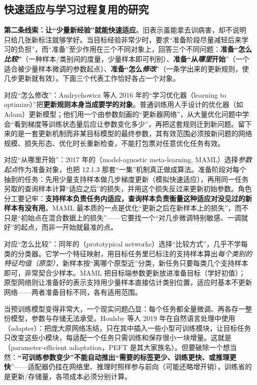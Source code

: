 \subsection{快速适应与学习过程复用的研究}
\label{sec:kts-overview-history-adaptation}

\textbf{第二条线索：让“少量新经验”就能快速适应}。旧表示虽能拿去训病害，却不说明只给几张新标注就够学好。当目标经验非常少时，要求“准备阶段尽量减轻后来学习的负担”，而“准备”至少作用在三个不同对象上，回答三个不同问题：\textbf{准备“怎么\emph{比较}”}（一种样本/类别间的度量，少量样本即可判别）、\textbf{准备“从\emph{哪里}开始}”（一个适合被少量样本微调的参数起点）、\textbf{准备“怎么\emph{修改}}”（一条学出来的更新规则，使几步更新就有效）。下面三个代表工作恰好各占一个对象。

对应“怎么修改”：Andrychowicz 等人 2016 年的“学习优化器（learning to optimize）”把\textbf{更新规则本身当成要学的对象}。普通训练用人手设计的优化器（如 Adam）更新模型；他们用一个由参数刻画的“更新器网络”，从大量优化问题中学会“看到梯度等训练状态量后应让参数变化多少”，再把这套规则迁到新问题。留下来的是一套更新机制而非某目标模型的最终参数，其有效范围必须按新问题的网络规模、损失形态、优化时长重新检查，不能打包票对任意优化任务有效。

对应“从哪里开始”：2017 年的（model-agnostic meta-learning, MAML）选择\emph{参数起点}作为准备对象，也把 12.1.3 那套“一集”机制真正做成算法。准备阶段对每个抽到的任务：先用少量支持样本做几步梯度更新（模拟快速适应），再用同一任务另取的查询样本计算“适应之后”的损失，并用这个损失反过来更新初始参数。角色分工要记牢：\textbf{支持样本负责任务内适应，查询样本负责衡量这种适应对没见过的新样本有没有用}。MAML 最本质的一点是优化“更新之后在新样本上的损失”，而不只是“初始点在混合数据上的损失”——它要找一个“对几步微调特别敏感、一调就好”的起点，而非一开始就最准的点。

对应“怎么比较”：同年的（prototypical networks）选择“比较方式”，几乎不学每类的分类器。它学一个特征映射，用目标任务里已标注的支持样本算出\emph{每个类别的特征均值（原型）}，新样本按“离哪个原型近”分类，新任务只要每类几个支持样本即可，非常契合少样本。MAML 把目标端参数更新放进准备目标（学好初值）；原型网络则让准备好的表示支持用少量样本直接估计类别位置，适应时基本不更新网络——两者准备目标不同，各有适用范围。

当预训练模型变得非常大，一个现实问题凸显：每个任务都全量微调、再各存一整份模型，参数与存储无法承受。Houlsby 等人 2019 年在自然语言处理中使用（adapter）：把庞大原网络冻结，只在其中插入一些小型可训练模块，让目标任务只改变这些小模块，每适配一个任务只需训练和保存很小一块增量。这就是（parameter-efficient adaptation，PEFT 是其大家族名）。但要破除一个想当然：\textbf{“可训练参数变少”不能自动推出“需要的标签更少、训练更快、或推理更快}”——适配器仍挂在网络里、推理时照样参与前向（可能还略增开销），训练省的是更新/存储量，各项成本必须分别计算。

